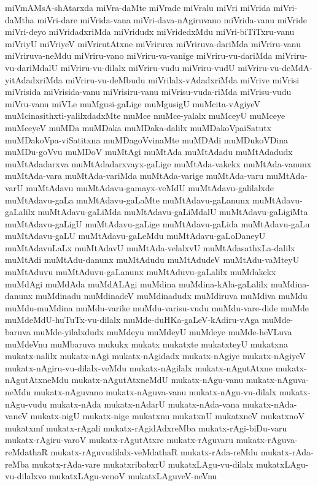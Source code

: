 {miVmAMsA-shAtarxda
miVra-daMte
miVrade
miVralu
miVri
miVrida
miVri-daMtha
miVri-dare
miVrida-vana
miVri-dava-nAgiruvano
miVrida-vanu
miVride
miVri-deyo
miVridadxriMda
miVridudx
miVridedxMdu
miVri-biTiTxru-vanu
miVriyU
miVriyeV
miVrirutAtxne
miVriruva
miVriruva-dariMda
miVriru-vanu
miVriruva-neMdu
miVriru-vano
miVriru-va-vanige
miVriru-vu-dariMda
miVriru-vu-dariMdalU
miVriru-vu-dilalx
miVriru-vudu
miVriru-vudU
miVriru-vu-deMdA-yitAdadxriMda
miVriru-vu-deMbudu
miVrilalx-vAdadxriMda
miVrive
miVrisi
miVrisida
miVrisida-vanu
miVrisiru-vanu
miVrisu-vuda-riMda
miVrisu-vudu
miVru-vanu
miVLe
muMgusi-gaLige
muMgusigU
muMcita-vAgiyeV
muMcinasithxti-yalilxdadxMte
muMce
muMce-yalalx
muMceyU
muMceye
muMceyeV
muMDa
muMDaka
muMDaka-dalilx
muMDakoVpaiSatutx
muMDakoVpa-viSatitxna
muMDagoVvinaMte
muMDAdi
muMDukoVDina
muMDu-goVvu
muMDoV
muMtAgi
muMtAda
muMtAdadu
muMtAdadudx
muMtAdadarxva
muMtAdadarxvayx-gaLige
muMtAda-vakekx
muMtAda-vanunx
muMtAda-vara
muMtAda-variMda
muMtAda-varige
muMtAda-varu
muMtAda-varU
muMtAdavu
muMtAdavu-gamayx-veMdU
muMtAdavu-galilalxde
muMtAdavu-gaLa
muMtAdavu-gaLaMte
muMtAdavu-gaLanunx
muMtAdavu-gaLalilx
muMtAdavu-gaLiMda
muMtAdavu-gaLiMdalU
muMtAdavu-gaLigiMta
muMtAdavu-gaLigU
muMtAdavu-gaLige
muMtAdavu-gaLida
muMtAdavu-gaLu
muMtAdavu-gaLU
muMtAdavu-gaLeMdu
muMtAdavu-gaLoDaneyU
muMtAdavuLaLx
muMtAdavU
muMtAda-velalxvU
muMtAdasathxLa-dalilx
muMtAdi
muMtAdu-danunx
muMtAdudu
muMtAdudeV
muMtAdu-vaMteyU
muMtAduvu
muMtAduvu-gaLanunx
muMtAduvu-gaLalilx
muMdakekx
muMdAgi
muMdAda
muMdALAgi
muMdina
muMdina-kAla-gaLalilx
muMdina-danunx
muMdinadu
muMdinadeV
muMdinadudx
muMdiruva
muMdiva
muMdu
muMdu-muMdina
muMdu-varike
muMdu-varisu-vudu
muMdu-vare-dide
muMde
muMdeMdU-huTuTx-vu-dilalx
muMde-duHKa-gaLeV-kAdiru-vAga
muMde-baruva
muMde-yilalxdudx
muMdeyu
muMdeyU
muMdeye
muMde-heVLuva
muMdeVnu
muMbaruva
mukukx
mukatx
mukatxte
mukatxteyU
mukatxna
mukatx-nalilx
mukatx-nAgi
mukatx-nAgidadx
mukatx-nAgiye
mukatx-nAgiyeV
mukatx-nAgiru-vu-dilalx-veMdu
mukatx-nAgilalx
mukatx-nAgutAtxne
mukatx-nAgutAtxneMdu
mukatx-nAgutAtxneMdU
mukatx-nAgu-vanu
mukatx-nAguva-neMdu
mukatx-nAguvano
mukatx-nAguva-vanu
mukatx-nAgu-vu-dilalx
mukatx-nAgu-vudu
mukatx-nAda
mukatx-nAdarU
mukatx-nAda-vana
mukatx-nAda-vaneV
mukatx-nigU
mukatx-nige
mukatxnu
mukatxnU
mukatxneV
mukatxnoV
mukatxmf
mukatx-rAgali
mukatx-rAgidAdxreMba
mukatx-rAgi-biDu-varu
mukatx-rAgiru-varoV
mukatx-rAgutAtxre
mukatx-rAguvaru
mukatx-rAguva-reMdathaR
mukatx-rAguvudilalx-veMdathaR
mukatx-rAda-reMdu
mukatx-rAda-reMba
mukatx-rAda-vare
mukatxribabxrU
mukatxLAgu-vu-dilalx
mukatxLAgu-vu-dilalxvo
mukatxLAgu-venoV
mukatxLAguveV-neVnu
}
